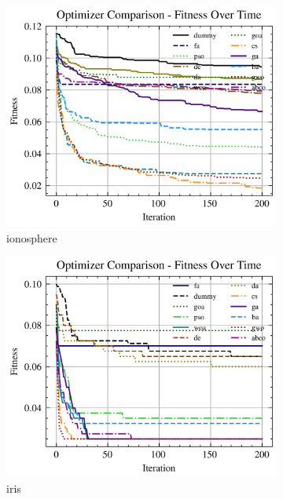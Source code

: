 \begin{figure}[htp]
    \begin{subfigure}[htp]{0.45\textwidth}
        \includegraphics[width=\textwidth]{imagenes/fitness_charts/img/real/ionosphere/optimizers_fitness_svc.png}
        \caption{ionosphere}
    \end{subfigure}
    \begin{subfigure}[htp]{0.45\textwidth}
        \includegraphics[width=\textwidth]{imagenes/fitness_charts/img/real/iris/optimizers_fitness_svc.png}
        \caption{iris}
    \end{subfigure}
    \begin{subfigure}[htp]{0.45\textwidth}

\end{subfigure}
\end{figure}
